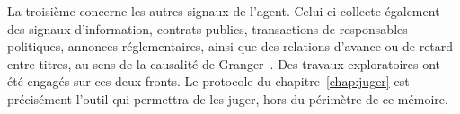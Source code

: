 La troisième concerne les autres signaux de l'agent. Celui-ci collecte
également des signaux d'information, contrats publics, transactions de
responsables politiques, annonces réglementaires, ainsi que des
relations d'avance ou de retard entre titres, au sens de la causalité de
Granger~\cite{granger1969}. Des travaux exploratoires ont été engagés
sur ces deux fronts. Le protocole du chapitre~\ref{chap:juger} est
précisément l'outil qui permettra de les juger, hors du périmètre de ce
mémoire.
